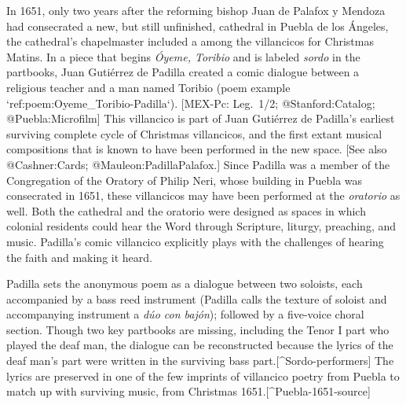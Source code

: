 In 1651, only two years after the reforming bishop Juan de Palafox y Mendoza had consecrated a new, but still unfinished, cathedral in Puebla de los Ángeles, the cathedral's chapelmaster included a  among the villancicos for Christmas Matins.
In a piece that begins \emph{Óyeme, Toribio} and is labeled \emph{sordo} in the partbooks,  Juan Gutiérrez de Padilla created a comic dialogue between a religious teacher and a  man named Toribio (poem example `ref:poem:Oyeme_Toribio-Padilla`).
[MEX-Pc: Leg.~1/2; @Stanford:Catalog; @Puebla:Microfilm]
This villancico is part of Juan Gutiérrez de Padilla's earliest surviving complete cycle of Christmas villancicos, and the first extant musical compositions that is known to have been performed in the new space.
[See also @Cashner:Cards; @Mauleon:PadillaPalafox.]
Since Padilla was a member of the Congregation of the Oratory of Philip Neri, whose building in Puebla was consecrated in 1651, these villancicos may have been performed at the \emph{oratorio} as well.
Both the cathedral and the oratorio were designed as spaces in which colonial residents could hear the Word through Scripture, liturgy, preaching, and music.
Padilla's comic  villancico explicitly plays with the challenges of hearing the faith and making it heard.


\label{poem:Oyeme_Toribio-Padilla}

Padilla sets the anonymous poem as a dialogue between two soloists, each accompanied by a bass reed instrument (Padilla calls the texture of soloist and accompanying instrument a \emph{dúo con bajón}); followed by a five-voice choral section.
Though two key partbooks are missing, including the Tenor I part who played the deaf man, the dialogue can be reconstructed because the lyrics of the deaf man's part were written in the surviving bass part.[^Sordo-performers]
The lyrics are preserved in one of the few imprints of villancico poetry from Puebla to match up with surviving music, from Christmas 1651.[^Puebla-1651-source]

